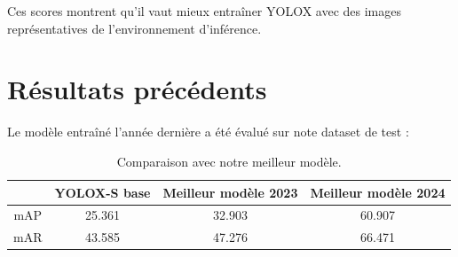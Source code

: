 Ces scores montrent qu'il vaut mieux entraîner YOLOX avec des images représentatives de 
l'environnement d'inférence. 
\section{Résultats précédents}

Le modèle entraîné l'année dernière a été évalué sur note dataset de test : \\

\begin{table}[h]
    \begin{center}
        \begin{tabular}{c c c c}
            \hline
            & YOLOX-S base & Meilleur modèle 2023 & \textbf{Meilleur modèle 2024} \\
            \hline
            mAP & 25.361 & 32.903 & 60.907 \\ 
            mAR & 43.585 & 47.276 & 66.471 \\
        \end{tabular}
    \end{center}
    \caption{Comparaison avec notre meilleur modèle.}
\end{table}

